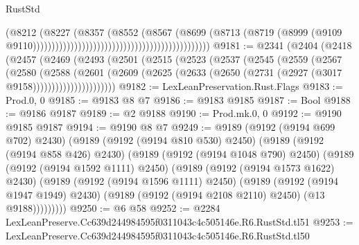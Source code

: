 \begin{lexlean}{RustStd}
\begin{coremodule}
                                                                              (@8212
                                                                                (@8227
                                                                                  (@8357
                                                                                    (@8552
                                                                                      (@8567
                                                                                        (@8699
                                                                                          (@8713
                                                                                            (@8719
                                                                                              (@8999
                                                                                                (@9109
                                                                                                  @9110)))))))))))))))))))))))))))))))))))))))))))))))
@9181 := @2341
    (@2404
      (@2418
        (@2457
          (@2469
            (@2493
              (@2501
                (@2515
                  (@2523
                    (@2537
                      (@2545
                        (@2559
                          (@2567
                            (@2580
                              (@2588
                                (@2601
                                  (@2609
                                    (@2625
                                      (@2633 (@2650 (@2731 (@2927 (@3017 @9158))))))))))))))))))))))
@9182 := LexLeanPreservation.Rust.Flags
@9183 := Prod.{0, 0}
@9185 := @9183 @8 @7
@9186 := @9183 @9185
@9187 := Bool
@9188 := @9186 @9187
@9189 := @2 @9188
@9190 := Prod.mk.{0, 0}
@9192 := @9190 @9185 @9187
@9194 := @9190 @8 @7
@9249 := @9189
    (@9192 (@9194 @699 @702) @2430)
    (@9189
      (@9192 (@9194 @810 @530) @2450)
      (@9189
        (@9192 (@9194 @858 @426) @2430)
        (@9189
          (@9192 (@9194 @1048 @790) @2450)
          (@9189
            (@9192 (@9194 @1592 @1111) @2450)
            (@9189
              (@9192 (@9194 @1573 @1622) @2430)
              (@9189
                (@9192 (@9194 @1596 @1111) @2450)
                (@9189
                  (@9192 (@9194 @1947 @1949) @2430)
                  (@9189 (@9192 (@9194 @2108 @2110) @2450) (@13 @9188)))))))))
@9250 := @6 @58
@9252 := @2284 LexLeanPreserve.Cc639d244984595f0311043c4c505146e.R6.RustStd.tl51
@9253 := LexLeanPreserve.Cc639d244984595f0311043c4c505146e.R6.RustStd.tl50

\end{coremodule}
\end{lexlean}
